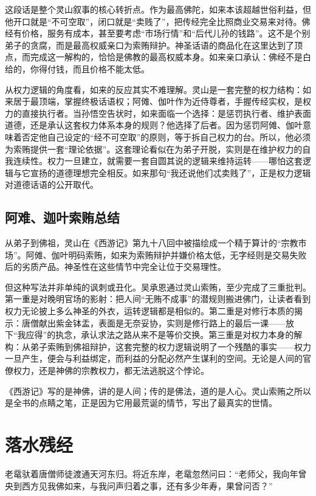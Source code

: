 \documentclass{ctexart}
\begin{document}
这段话是整个灵山叙事的核心转折点。作为最高佛陀，如来本该超越世俗利益，但他开口就是“不可空取”，闭口就是“卖贱了”，把传经完全比照商业交易来对待。佛经有价格，服务有成本，甚至要考虑“市场行情”和“后代儿孙的钱路”。这不是个别弟子的贪腐，而是最高权威亲口为索贿辩护。神圣话语的商品化在这里达到了顶点，而完成这一解构的，恰恰是佛教的最高权威本身。如来亲口承认：佛经不是白给的，你得付钱，而且价格不能太低。

从权力逻辑的角度看，如来的反应其实不难理解。灵山是一套完整的权力结构：如来居于最顶端，掌握终极话语权；阿傩、伽叶作为近侍尊者，手握传经实权，是权力的直接执行者。当孙悟空告状时，如来面临一个选择：是惩罚执行者、维护表面道德，还是承认这套权力体系本身的规则？他选择了后者。因为惩罚阿傩、伽叶意味着否定他自己设定的“经不可空取”的原则，等于拆自己权力的台。所以，他必须为索贿提供一套“理论依据”。这套理论看似在为弟子开脱，实则是在维护权力的自我连续性。权力一旦建立，就需要一套自圆其说的逻辑来维持运转——哪怕这套逻辑与它宣扬的道德理想完全相反。如来那句“我还说他们忒卖贱了”，正是权力逻辑对道德话语的公开取代。

\subsection{阿难、迦叶索贿总结}

从弟子到佛祖，灵山在《西游记》第九十八回中被描绘成一个精于算计的“宗教市场”。阿傩、伽叶明码索贿，如来为索贿辩护并嫌价格太低，无字经则是交易失败后的劣质产品。神圣性在这些情节中完全让位于交易理性。

但这种写法并非单纯的讽刺或丑化。吴承恩通过灵山索贿，至少完成了三重批判。第一重是对晚明官场的影射：把人间“无贿不成事”的潜规则搬进佛门，让读者看到权力无论披上多么神圣的外衣，运转逻辑都是相似的。第二重是对修行本质的揭示：唐僧献出紫金钵盂，表面是无奈妥协，实则是修行路上的最后一课——放下“我应得”的执念，承认求法之路从来不是等价交换。第三重是对权力本身的解构：从弟子索贿到佛祖辩护，这套完整的权力逻辑说明了一个残酷的事实——权力一旦产生，便会与利益绑定，而利益的分配必然产生谋利的空间。无论是人间的官僚权力，还是神佛的宗教权力，都无法逃脱这个悖论。

《西游记》写的是神佛，讲的是人间；传的是佛法，道的是人心。灵山索贿之所以是全书的点睛之笔，正是因为它用最荒诞的情节，写出了最真实的世情。

\section{落水残经}

老鼋驮着唐僧师徒渡通天河东归。将近东岸，老鼋忽然问曰：“老师父，我向年曾央到西方见我佛如来，与我问声归着之事，还有多少年寿，果曾问否？”
\end{document}
